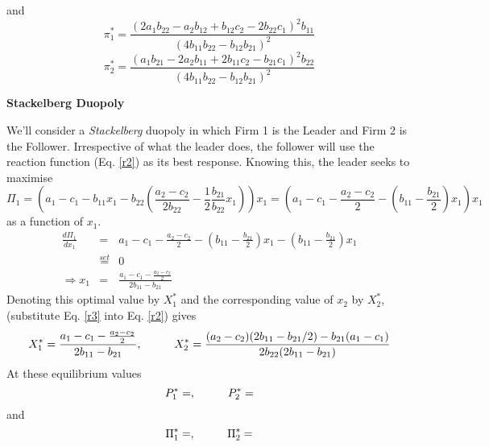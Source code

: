 \documentclass[12pt]{article}
\begin{document}
and
 \begin{equation} \pi_1^* =\frac{ (2a_1b_{22}-a_2b_{12}+b_{12}c_2-2b_{22}c_1)^2b_{11}}{(4b_{11}b_{22}-b_{12}b_{21})^2} \label{cp1} \end{equation}
  \begin{equation} \pi_2^* = \frac{(a_1b_{21}-2a_2b_{11}+2b_{11}c_2-b_{21}c_1)^2b_{22}}{(4b_{11}b_{22}-b_{12}b_{21})^2} \label{cp2} \end{equation}


 \begin{center}
\textbf{Stackelberg Duopoly %
}
\end{center}
We'll consider a \textit{Stackelberg} duopoly in which Firm 1 is the Leader and Firm 2 is the Follower. Irrespective of what the leader does, the follower will use the reaction function (Eq. \ref{r2}) as its best response.
\newpage
Knowing this, the leader seeks to maximise $$ \Pi_1 = \left(a_1-c_1 - b_{11}x_1 -b_{22}\left( \frac{a_2-c_2}{2b_{22}} - \frac{1}{2}\frac{b_{21}}{b_{22}} x_1\right)\right) x_1 = \left( a_1 - c_1 - \frac{a_2 - c_2}{2} - \left(b_{11} - \frac{b_{21}}{2}\right)x_1\right)x_1$$
as a function of $x_1$.
\begin{eqnarray}
 \frac{d \Pi_1} {d x_1} &=&a_1 - c_1 - \frac{ a_2 - c_2}{2} - \left(b_{11} - \frac{b_{21}}{2}\right)x_1 - \left(b_{11} - \frac{b_{21}}{2}\right)x_1 \nonumber \\
 & \stackrel{set}{=} & 0 \nonumber \\
 \Rightarrow x_1 &=& \frac{a_1 - c_1 - \frac{ a_2 - c_2}{2}}{2b_{11}-b_{21}} \label{r3}
 \end{eqnarray}
 Denoting this optimal value by $X_1^*$ and the corresponding value of $x_2$ by $X_2^*$,(substitute Eq. \ref{r3} into Eq. \ref{r2}) gives
$$ X_1^* = \frac{a_1 - c_1 - \frac{ a_2 - c_2}{2}}{2b_{11}-b_{21}}, \hspace{10mm} X_2^* = \frac{(a_2-c_2)(2b_{11}-b_{21}/2)-b_{21}(a_1-c_1)}{2b_{22}(2b_{11}-b_{21})} $$
At these equilibrium values
$$ P_1^* = , \hspace{10mm} P_2^*= $$
 and
 \begin{equation} \Pi_1^* = , \hspace{10mm} \Pi_2^* = \label{sp} \end{equation}
\end{document}
